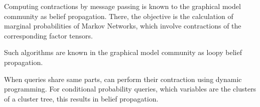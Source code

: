 
Computing contractions by message passing is known to the graphical model community as belief propagation.
There, the objective is the calculation of marginal probabilities of Markov Networks, which involve contractions of the corresponding factor tensors.

\begin{remark}

	Such algorithms are known in the graphical model community as loopy belief propagation.
\end{remark}




When queries share same parts, can perform their contraction using dynamic programming.
For conditional probability queries, which variables are the clusters of a cluster tree, this results in belief propagation.









